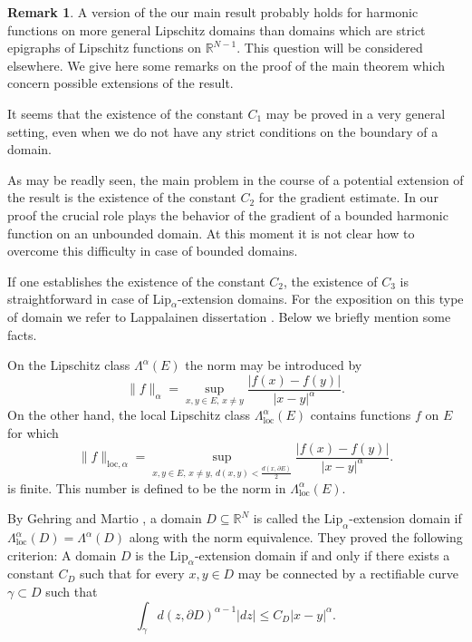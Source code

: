 \documentclass[10pt]{amsart}
\theoremstyle{definition}
\newtheorem{remark}[theorem]{Remark}
\numberwithin{equation}{section}
\begin{document}
\begin{remark}
A version of the our main result probably holds  for harmonic functions on more general Lipschitz domains than   domains
which are strict epigraphs of Lipschitz  functions on    $\mathbb{R}^ {N-1}$.         This question will  be  considered
elsewhere. We give here some remarks on the proof of the main theorem which concern possible extensions of the   result.

It seems that  the existence  of the constant  $C_1$ may be proved in a very  general setting, even when we do not  have
any strict  conditions  on the  boundary of a  domain.

As  may be readly  seen, the main problem in the course of a   potential extension of the result is  the  existence   of
the constant $C_2$ for the gradient estimate. In our  proof  the crucial role plays the behavior of the gradient  of   a
bounded harmonic function on an unbounded domain.     At this moment it is not clear  how to overcome this difficulty in
case of  bounded domains.

If  one  establishes the existence of the constant  $C_2$, the existence of  $C_3$ is straightforward in case         of
Lip$_\alpha$-extension domains.  For the exposition on this type of domain    we refer  to Lappalainen      dissertation
\cite{LAPPALAINEN.AASF}.  Below  we briefly  mention  some facts.

On  the  Lipschitz  class  $\Lambda^\alpha (E)$  the norm  may be   introduced by
\begin{equation*}
\|f\|_{\alpha} = \sup _{x,  y\in E,\, x\ne y}  \frac {|f(x) - f(y)|}{|x-y|^\alpha}.
\end{equation*}
On the other hand, the local Lipschitz class $\Lambda^\alpha _ \mathrm {loc}(E)$ contains functions $f$ on $E$ for which
\begin{equation*}
\|f\|_{ \mathrm{loc}, \alpha} = \sup _{x,  y\in E,\,  x\ne y,\,  d(x,y)< \frac {d(x,\partial E)}2} 
\frac {|f(x) - f(y)|}{|x-y|^\alpha}.
\end{equation*}
is  finite. This number is defined  to be  the  norm in   $\Lambda^\alpha _ \mathrm {loc}(E)$.

By Gehring and Martio \cite{GEHRING.AASF},                             a domain $D\subseteq \mathbb {R}^N$ is called the
$\mathrm {Lip}_\alpha$-extension  domain if    $\Lambda^\alpha_\mathrm{loc}(D) =\Lambda^\alpha(D)$ along  with  the norm
equivalence.  They proved the  following  criterion: A domain $D$ is the $\mathrm {Lip}_\alpha$-extension domain if  and
only if there exists a constant $C_D$ such that for every     $x, y\in D$ may be connected by       a rectifiable  curve
$\gamma\subset D$ such that
\begin{equation}\label{EQ.CD}
\int_\gamma d(z,\partial  D) ^{\alpha-1} |dz|\le C_D |x-y|^\alpha.
\end{equation}


\end{remark}
\end{document}
